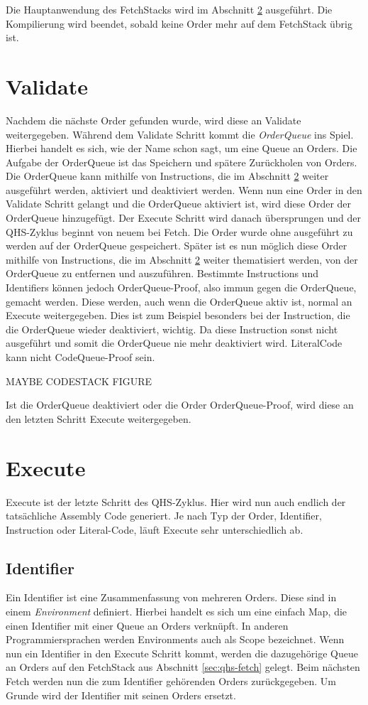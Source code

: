 Die Hauptanwendung des FetchStacks wird im Abschnitt \ref{sec:qhs-execute} ausgeführt.
Die Kompilierung wird beendet, sobald keine Order mehr auf dem FetchStack übrig ist.

\section{Validate} \label{sec:qhs-Validate}
Nachdem die nächste Order gefunden wurde, wird diese an Validate weitergegeben. Während dem Validate Schritt kommt die \textit{OrderQueue} ins Spiel. Hierbei handelt es sich, wie der Name schon sagt, um eine Queue an Orders.
Die Aufgabe der OrderQueue ist das Speichern und spätere Zurückholen von Orders. Die OrderQueue kann mithilfe von Instructions, die im Abschnitt \ref{sec:qhs-execute} weiter ausgeführt werden, aktiviert und deaktiviert werden.
Wenn nun eine Order in den Validate Schritt gelangt und die OrderQueue aktiviert ist, wird diese Order der OrderQueue hinzugefügt. Der Execute Schritt wird danach übersprungen und der QHS-Zyklus beginnt von neuem bei Fetch.
Die Order wurde ohne ausgeführt zu werden auf der OrderQueue gespeichert. Später ist es nun möglich diese Order mithilfe von Instructions, die im Abschnitt \ref{sec:qhs-execute} weiter thematisiert werden, 
von der OrderQueue zu entfernen und auszuführen. Bestimmte Instructions und Identifiers können jedoch OrderQueue-Proof, also immun gegen die OrderQueue, gemacht werden. Diese werden, auch wenn die OrderQueue aktiv ist, 
normal an Execute weitergegeben. Dies ist zum Beispiel besonders bei der Instruction, die die OrderQueue wieder deaktiviert, wichtig. Da diese Instruction sonst nicht ausgeführt und somit die OrderQueue nie mehr deaktiviert wird.
LiteralCode kann nicht CodeQueue-Proof sein.

MAYBE CODESTACK FIGURE

Ist die OrderQueue deaktiviert oder die Order OrderQueue-Proof, wird diese an den letzten Schritt Execute weitergegeben.

\section{Execute} \label{sec:qhs-execute}
Execute ist der letzte Schritt des QHS-Zyklus. Hier wird nun auch endlich der tatsächliche Assembly Code generiert. Je nach Typ der Order, Identifier, Instruction oder Literal-Code, läuft Execute sehr unterschiedlich ab.

\subsection{Identifier}
Ein Identifier ist eine Zusammenfassung von mehreren Orders. Diese sind in einem \textit{Environment} definiert.
Hierbei handelt es sich um eine einfach Map, die einen Identifier mit einer Queue an Orders verknüpft.
In anderen Programmiersprachen werden Environments auch als Scope bezeichnet.
Wenn nun ein Identifier in den Execute Schritt kommt, werden die dazugehörige Queue an Orders auf den FetchStack aus Abschnitt \ref{sec:qhs-fetch} gelegt.
Beim nächsten Fetch werden nun die zum Identifier gehörenden Orders zurückgegeben. Um Grunde wird der Identifier mit seinen Orders ersetzt.

